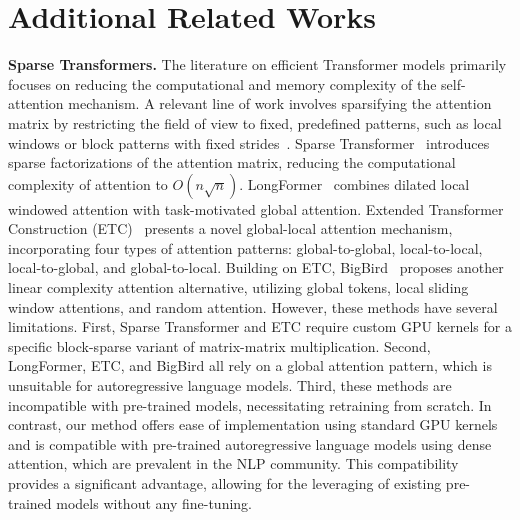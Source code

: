 \documentclass{article} \usepackage{iclr2024_conference,times}
\begin{document}
\section{Additional Related Works}
\textbf{Sparse Transformers.} The literature on efficient Transformer models primarily focuses on reducing the computational and memory complexity of the self-attention mechanism. A relevant line of work involves sparsifying the attention matrix by restricting the field of view to fixed, predefined patterns, such as local windows or block patterns with fixed strides~\citep{tay2022efficient}.
Sparse Transformer~\citep{child2019generating} introduces sparse factorizations of the attention matrix, reducing the computational complexity of attention to $O(n\sqrt{n})$. LongFormer~\citep{beltagy2020longformer} combines dilated local windowed attention with task-motivated global attention. Extended Transformer Construction (ETC)~\cite{ainslie2020etc} presents a novel global-local attention mechanism, incorporating four types of attention patterns: global-to-global, local-to-local, local-to-global, and global-to-local. Building on ETC, BigBird~\citep{zaheer2020big} proposes another linear complexity attention alternative, utilizing global tokens, local sliding window attentions, and random attention.
However, these methods have several limitations. First, Sparse Transformer and ETC require custom GPU kernels for a specific block-sparse variant of matrix-matrix multiplication. Second, LongFormer, ETC, and BigBird all rely on a global attention pattern, which is unsuitable for autoregressive language models. Third, these methods are incompatible with pre-trained models, necessitating retraining from scratch.
In contrast, our method offers ease of implementation using standard GPU kernels and is compatible with pre-trained autoregressive language models using dense attention, which are prevalent in the NLP community. This compatibility provides a significant advantage, allowing for the leveraging of existing pre-trained models without any fine-tuning.
\end{document}
